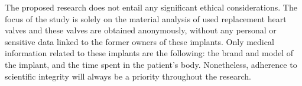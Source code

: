 The proposed research does not entail any significant ethical considerations. The focus of the study is solely on the material analysis of used replacement heart valves and these valves are obtained anonymously, without any personal or sensitive data linked to the former owners of these implants. Only medical information related to these implants are the following: the brand and model of the implant, and the time spent in the patient's body. Nonetheless, adherence to scientific integrity will always be a priority throughout the research.

